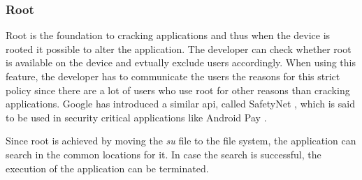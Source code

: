 \subsubsection{Root} \label{subsection:counter-improve-tampering-root}
Root is the foundation to cracking applications and thus when the device is rooted it possible to alter the application.
The developer can check whether root is available on the device and evtually exclude users accordingly.
When using this feature, the developer has to communicate the users the reasons for this strict policy since there are a lot of users who use root for other reasons than cracking applications.
Google has introduced a similar \gls{api}, called SafetyNet \cite{safetynetPay}, which is said to be used in security critical applications like Android Pay \cite{safetynetGoogle} \cite{safetynetPayx}.
\newline

Since root is achieved by moving the \textit{su} file to the file system, the application can search in the common locations for it.
In case the search is successful, the execution of the application can be terminated.

